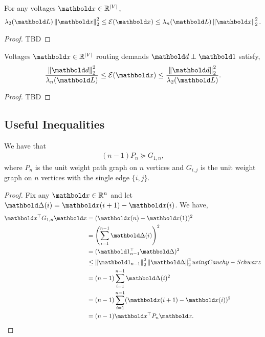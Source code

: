 \begin{lem}
For any voltages $\vx \in \R^{|\sV|}$, \begin{align}
    \lambda_2(\mL) \norm{\vx}_2^2 \leq \spa{E}(\vx) \leq \lambda_n(\mL) \norm{\vx}_2^2.
\end{align}
\end{lem}
\begin{proof}
TBD
\end{proof}

\begin{lem}
Voltages $\vx \in \R^{|\sV|}$ routing demands $\vd \perp \vOne$ satisfy, \begin{align}
    \frac{\norm{\vd}_2^2}{\lambda_n(\mL)} \leq \spa{E}(\vx) \leq \frac{\norm{\vd}_2^2}{\lambda_2(\mL)}.
\end{align}
\end{lem}
\begin{proof}
TBD
\end{proof}

\subsection{Useful Inequalities}

\begin{lem} We have that \begin{align}
    (n-1) P_n \succeq G_{1,n},
\end{align} where $P_n$ is the unit weight path graph on $n$ vertices and $G_{i,j}$ is the unit weight graph on $n$ vertices with the single edge $\{i,j\}$.
\end{lem}
\begin{proof}
Fix any $\vx \in \R^n$ and let $\vDelta(i) \defeq \vx(i+1) - \vx(i)$. We have, \begin{align*}
    \trans{\vx}G_{1,n}\vx &= (\vx(n) - \vx(1))^2 \\
    &= \parentheses*{\sum_{i=1}^{n-1} \vDelta(i)}^2 \\
    &= (\trans{\vOne_{n-1}}\vDelta)^2 \\
    &\leq \norm{\vOne_{n-1}}_2^2 \norm{\vDelta}_2^2 \margintag{using Cauchy-Schwarz} \\
    &= (n-1) \sum_{i=1}^{n-1} \vDelta(i)^2 \\
    &= (n-1) \sum_{i=1}^{n-1} (\vx(i+1) - \vx(i))^2 \\
    &= (n-1)\trans{\vx}P_n\vx. \qedhere
\end{align*}
\end{proof}

